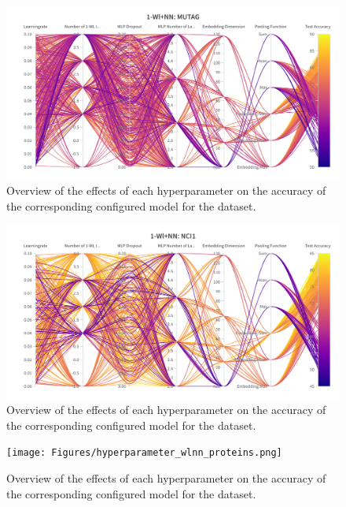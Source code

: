 \begin{figure}[H]
    \centering
    \includegraphics[width=\textwidth]{Figures/hyperparameter_wlnn_mutag.png}
    \vspace*{-30pt}
    \caption{Overview of the effects of each hyperparameter on the accuracy of the corresponding configured \wlnn model for the \mutag dataset.}
\end{figure}
\vfill
\begin{figure}[H]
    \centering
    \includegraphics[width=\textwidth]{Figures/hyperparameter_wlnn_nci1.png}
    \vspace*{-30pt}
    \caption{Overview of the effects of each hyperparameter on the accuracy of the corresponding configured \wlnn model for the \nci dataset.}
\end{figure}

\begin{figure}[H]
    \centering
    \texttt{[image: Figures/hyperparameter\_wlnn\_proteins.png]}
    \vspace*{-30pt}
    \caption{Overview of the effects of each hyperparameter on the accuracy of the corresponding configured \wlnn model for the \proteins dataset.}
\end{figure}

